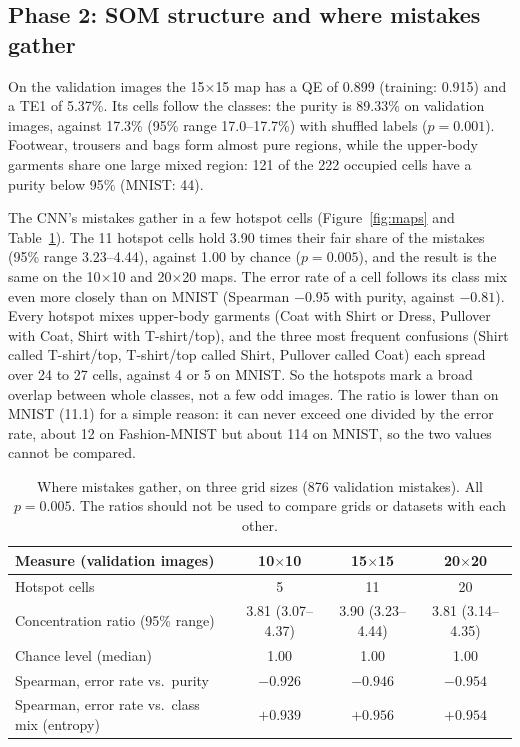 \documentclass[11pt]{article}
\begin{document}
\subsection{Phase 2: SOM structure and where mistakes gather}

On the validation images the 15$\times$15 map has a QE of 0.899 (training: 0.915) and a TE1 of 5.37\%. Its cells follow the classes: the purity is 89.33\% on validation images, against 17.3\% (95\% range 17.0--17.7\%) with shuffled labels ($p=0.001$). Footwear, trousers and bags form almost pure regions, while the upper-body garments share one large mixed region: 121 of the 222 occupied cells have a purity below 95\% (MNIST: 44).

The CNN's mistakes gather in a few hotspot cells (Figure~\ref{fig:maps} and Table~\ref{tab:phase2}). The 11 hotspot cells hold 3.90 times their fair share of the mistakes (95\% range 3.23--4.44), against 1.00 by chance ($p=0.005$), and the result is the same on the 10$\times$10 and 20$\times$20 maps.
The error rate of a cell follows its class mix even more closely than on MNIST (Spearman $-0.95$ with purity, against $-0.81$). Every hotspot mixes upper-body garments (Coat with Shirt or Dress, Pullover with Coat, Shirt with T-shirt/top), and the three most frequent confusions (Shirt called T-shirt/top, T-shirt/top called Shirt, Pullover called Coat) each spread over 24 to 27 cells, against 4 or 5 on MNIST. So the hotspots mark a broad overlap between whole classes, not a few odd images.
The ratio is lower than on MNIST (11.1) for a simple reason: it can never exceed one divided by the error rate, about 12 on Fashion-MNIST but about 114 on MNIST, so the two values cannot be compared.

\begin{table}[H]
\centering
\renewcommand{\arraystretch}{1.12}
\small
\begin{tabular}{|l|c|c|c|}
\hline
\textbf{Measure (validation images)} & \textbf{10$\times$10} & \textbf{15$\times$15} & \textbf{20$\times$20} \\ \hline
Hotspot cells & 5 & 11 & 20 \\ \hline
Concentration ratio (95\% range) & 3.81 (3.07--4.37) & 3.90 (3.23--4.44) & 3.81 (3.14--4.35) \\ \hline
Chance level (median) & 1.00 & 1.00 & 1.00 \\ \hline
Spearman, error rate vs.\ purity & $-0.926$ & $-0.946$ & $-0.954$ \\ \hline
Spearman, error rate vs.\ class mix (entropy) & $+0.939$ & $+0.956$ & $+0.954$ \\ \hline
\end{tabular}
\caption{Where mistakes gather, on three grid sizes (876 validation mistakes). All $p=0.005$. The ratios should not be used to compare grids or datasets with each other.}
\label{tab:phase2}
\end{table}
\end{document}
